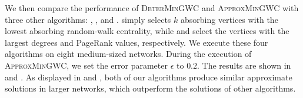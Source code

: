 \documentclass[10pt,twocolumn,twoside]{IEEEtran}
\begin{document}
We then compare the performance of \textsc{DeterMinGWC} and \textsc{ApproxMinGWC} with three other algorithms: , , and .
 simply selects \(k\) absorbing vertices with the lowest absorbing random-walk centrality, while  and  select the vertices with the largest degrees and PageRank values, respectively.
We execute these four algorithms on eight medium-sized networks.
During the execution of \textsc{ApproxMinGWC}, we set the error parameter \(\epsilon\) to \(0.2\).
The results are shown in  and .
As displayed in  and , both of our algorithms produce similar approximate solutions in larger networks, which outperform the solutions of other algorithms.
\end{document}

